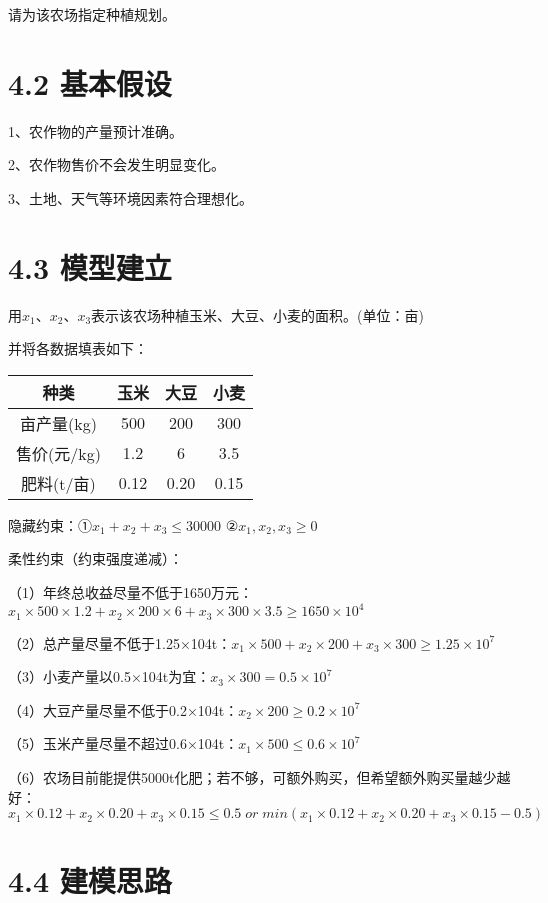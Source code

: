 \documentclass[bachelor,openany,oneside,color]{buaathesis}
\begin{document}
请为该农场指定种植规划。

\hypertarget{header-n308}{%
\section{4.2 基本假设}\label{header-n308}}

1、农作物的产量预计准确。

2、农作物售价不会发生明显变化。

3、土地、天气等环境因素符合理想化。

\hypertarget{header-n312}{%
\section{4.3 模型建立}\label{header-n312}}

用\(x_1\)、\(x_2\)、\(x_3\)表示该农场种植玉米、大豆、小麦的面积。(单位：亩)

并将各数据填表如下：

\begin{longtable}[]{@{}cccc@{}}
\toprule
种类 & 玉米 & 大豆 & 小麦\tabularnewline
\midrule
\endhead
亩产量(kg) & 500 & 200 & 300\tabularnewline
售价(元/kg) & 1.2 & 6 & 3.5\tabularnewline
肥料(t/亩) & 0.12 & 0.20 & 0.15\tabularnewline
\bottomrule
\end{longtable}

隐藏约束：①\(x_1+x_2+x_3\leq 30000\) ②\(x_1,x_2,x_3\geq0\)

柔性约束（约束强度递减）：

（1）年终总收益尽量不低于1650万元：\(x_1\times500\times1.2+x_2\times200\times6+x_3\times300\times3.5\geq 1650\times10^4\)

（2）总产量尽量不低于1.25×104t：\(x_1\times500+x_2\times200+x_3\times300\geq1.25\times10^7\)

（3）小麦产量以0.5×104t为宜：\(x_3\times300= 0.5\times10^7\)

（4）大豆产量尽量不低于0.2×104t：\(x_2\times200\geq0.2\times10^7\)

（5）玉米产量尽量不超过0.6×104t：\(x_1\times500\leq0.6\times10^7\)

（6）农场目前能提供5000t化肥；若不够，可额外购买，但希望额外购买量越少越好：\(x_1\times0.12+x_2\times0.20+x_3\times0.15\leq0.5\;or\;min(x_1\times0.12+x_2\times0.20+x_3\times0.15-0.5)\)

\hypertarget{header-n344}{%
\section{4.4 建模思路}\label{header-n344}}
\end{document}

